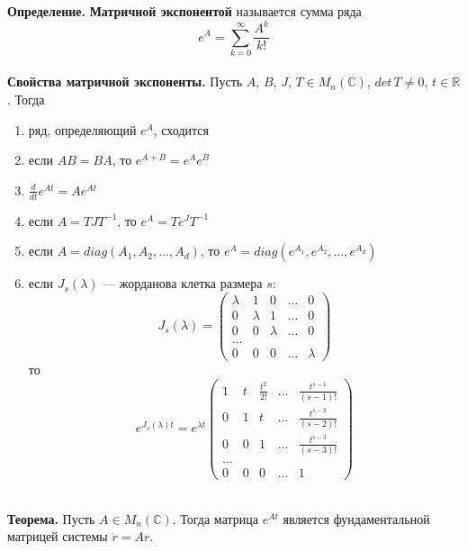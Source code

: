 \noindent \textbf{Определение.} \textbf{Матричной экспонентой} называется сумма ряда
\begin{equation*}
    e^{A} = \sum_{k = 0}^{\infty} \frac{A^k}{k!}
\end{equation*}
\\
\noindent \textbf{Свойства матричной экспоненты.} Пусть $A$, $B$, $J$, $T \in M_n(\mathbb{C})$, $det\, T \neq 0$, $t \in \mathbb{R}$. Тогда
\begin{enumerate}
    \item ряд, определяющий $e^A$, сходится
    \item если $AB = BA$, то $e^{A+B} = e^{A}e^{B}$
    \item $\frac{d}{dt}e^{At} = Ae^{At}$
    \item если $A = TJT^{-1}$, то $e^A = Te^JT^{-1}$
    \item если $A = diag(A_1, A_2, \ldots, A_d)$, то $e^A = diag(e^{A_1}, e^{A_2}, \ldots, e^{A_d})$
    \item если $J_s(\lambda)$ --- жорданова клетка размера $s$:
    \begin{equation*}
        J_s(\lambda) = \begin{pmatrix}
            \lambda & 1 & 0 & \ldots & 0\\
            0 & \lambda & 1 & \ldots & 0\\
            0 & 0 & \lambda & \ldots & 0\\
            \ldots\\
            0 & 0 & 0 & \ldots & \lambda
        \end{pmatrix}
    \end{equation*}
    то
    \begin{equation*}
        e^{J_s(\lambda)t} = e^{\lambda t} \begin{pmatrix}
        1 & t & \frac{t^2}{2!} & \ldots & \frac{t^{s-1}}{(s-1)!}\\
        0 & 1 & t & \ldots & \frac{t^{s-2}}{(s-2)!}\\
        0 & 0 & 1 & \ldots & \frac{t^{s-3}}{(s-3)!}\\
        \ldots\\
        0 & 0 & 0 & \ldots & 1
        \end{pmatrix}
    \end{equation*}
\end{enumerate}
\\
\noindent \textbf{Теорема.} Пусть $A \in M_n(\mathbb{C})$. Тогда матрица $e^{At}$ является фундаментальной матрицей системы $\dot{r} = Ar$.\\

